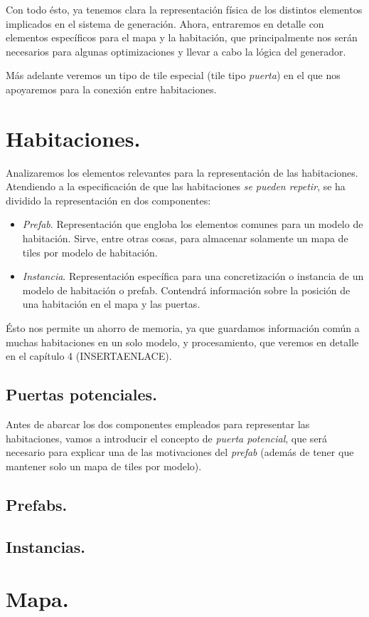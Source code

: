 Con todo ésto, ya tenemos clara la representación física de los distintos elementos implicados en el sistema de generación. Ahora, entraremos en detalle con elementos específicos para el mapa y la habitación, que principalmente nos serán necesarios para algunas optimizaciones y llevar a cabo la lógica del generador.

Más adelante veremos un tipo de tile especial (tile tipo \emph{puerta}) en el que nos apoyaremos para la conexión entre habitaciones.

\section{Habitaciones.}

Analizaremos los elementos relevantes para la representación de las habitaciones. Atendiendo a la especificación de que las habitaciones \emph{se pueden repetir}, se ha dividido la representación en dos componentes:

\begin{itemize}
	\item \emph{Prefab}. Representación que engloba los elementos comunes para un modelo de habitación. Sirve, entre otras cosas, para almacenar solamente un mapa de tiles por modelo de habitación.
	\item \emph{Instancia}. Representación específica para una concretización o instancia de un modelo de habitación o prefab. Contendrá información sobre la posición de una habitación en el mapa y las puertas.
\end{itemize}

Ésto nos permite un ahorro de memoria, ya que guardamos información común a muchas habitaciones en un solo modelo, y procesamiento, que veremos en detalle en el capítulo 4 (INSERTAENLACE).

\subsection{Puertas potenciales.}

Antes de abarcar los dos componentes empleados para representar las habitaciones, vamos a introducir el concepto de \emph{puerta potencial}, que será necesario para explicar una de las motivaciones del \emph{prefab} (además de tener que mantener solo un mapa de tiles por modelo).



\subsection{Prefabs.}

\subsection{Instancias.}

\section{Mapa.}

